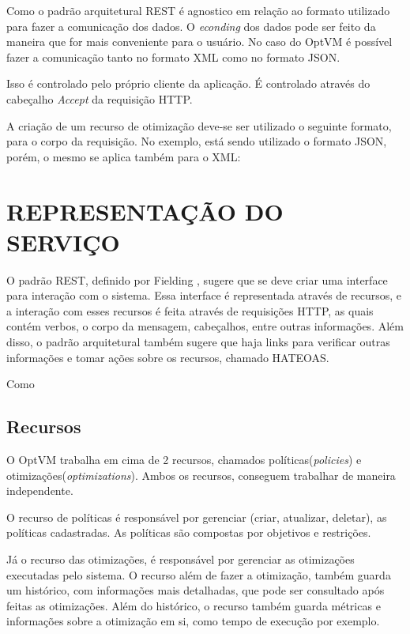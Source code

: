 Como o padrão arquitetural REST é agnostico em relação ao formato utilizado para fazer a comunicação dos dados. O \textit{econding} 
dos dados pode ser feito da maneira que for mais conveniente para o usuário. No caso do OptVM é possível fazer a comunicação
tanto no formato XML como no formato JSON.

Isso é controlado pelo próprio cliente da aplicação. É controlado através do cabeçalho \textit{Accept}
da requisição HTTP.

A criação de um recurso de otimização deve-se ser utilizado o seguinte formato, para o corpo da requisição. No exemplo, está sendo
utilizado o formato JSON, porém, o mesmo se aplica também para o XML:

\section{REPRESENTAÇÃO DO SERVIÇO}

O padrão REST, definido por Fielding \cite{fielding}, sugere que se deve criar uma interface para interação com o sistema. 
Essa interface é representada através de recursos, e a interação com esses recursos é feita através de requisições HTTP, 
as quais contém verbos, o corpo da mensagem, cabeçalhos, entre outras informações. Além disso, o padrão arquitetural também sugere que 
haja links para verificar outras informações e tomar ações sobre os recursos, chamado HATEOAS.

Como

\subsection{Recursos}

O OptVM trabalha em cima de 2 recursos, chamados políticas(\textit{policies}) e otimizações(\textit{optimizations}). 
Ambos os recursos, conseguem trabalhar de maneira independente.

O recurso de políticas é responsável por gerenciar (criar, atualizar, deletar), as políticas
cadastradas. As políticas são compostas por objetivos e restrições. 

Já o recurso das otimizações, é responsável por gerenciar as otimizações executadas pelo sistema. O recurso 
além de fazer a otimização, também guarda um histórico, com informações mais detalhadas, 
que pode ser consultado após feitas as otimizações. Além do histórico, o recurso também guarda métricas e informações sobre
a otimização em si, como tempo de execução por exemplo.

